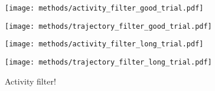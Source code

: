 \documentclass[../main.tex]{subfiles}
\begin{document}

\begin{figure}[tph]
  \begin{minipage}[b]{0.7\linewidth}
    \centering
    \texttt{[image: methods/activity\_filter\_good\_trial.pdf]}
    \subcaption{}
    \vspace{4ex}
  \end{minipage}%
  \begin{minipage}[b]{0.3\linewidth}
    \centering
    \texttt{[image: methods/trajectory\_filter\_good\_trial.pdf]}
    \subcaption{}
    \vspace{4ex}
  \end{minipage}
  \begin{minipage}[b]{0.7\linewidth}
    \centering
    \texttt{[image: methods/activity\_filter\_long\_trial.pdf]}
    \subcaption{}
    \vspace{4ex}
  \end{minipage}%
  \begin{minipage}[b]{0.3\linewidth}
    \centering
    \texttt{[image: methods/trajectory\_filter\_long\_trial.pdf]}
    \subcaption{}
    \vspace{4ex}
  \end{minipage}
  \caption[Activity filter for EMG and trajectories]{Activity filter!}\label{fig:activity_filter}
\end{figure}



\end{document}
